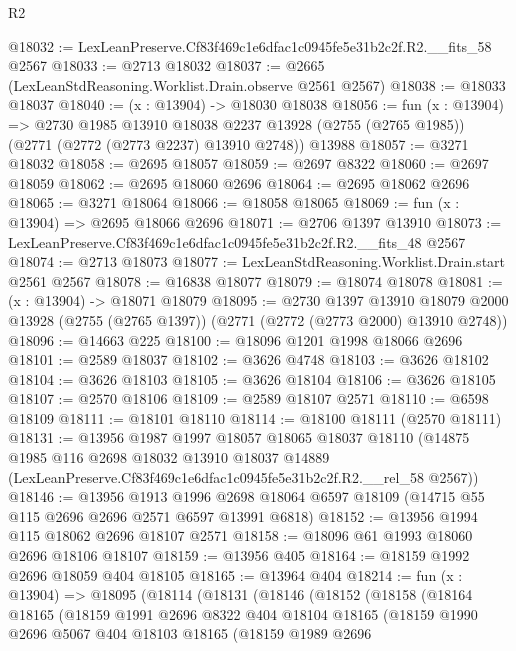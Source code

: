 \begin{lexlean}{R2}
\begin{coremodule}
@18032 := LexLeanPreserve.Cf83f469c1e6dfac1c0945fe5e31b2c2f.R2.__fits_58 @2567
@18033 := @2713 @18032
@18037 := @2665 (LexLeanStdReasoning.Worklist.Drain.observe @2561 @2567)
@18038 := @18033 @18037
@18040 := (x : @13904) -> @18030 @18038
@18056 := fun (x : @13904) =>
  @2730
    @1985
    @13910
    @18038
    @2237
    @13928
    (@2755 (@2765 @1985))
    (@2771 (@2772 (@2773 @2237) @13910 @2748))
    @13988
@18057 := @3271 @18032
@18058 := @2695 @18057
@18059 := @2697 @8322
@18060 := @2697 @18059
@18062 := @2695 @18060 @2696
@18064 := @2695 @18062 @2696
@18065 := @3271 @18064
@18066 := @18058 @18065
@18069 := fun (x : @13904) => @2695 @18066 @2696
@18071 := @2706 @1397 @13910
@18073 := LexLeanPreserve.Cf83f469c1e6dfac1c0945fe5e31b2c2f.R2.__fits_48 @2567
@18074 := @2713 @18073
@18077 := LexLeanStdReasoning.Worklist.Drain.start @2561 @2567
@18078 := @16838 @18077
@18079 := @18074 @18078
@18081 := (x : @13904) -> @18071 @18079
@18095 := @2730
    @1397
    @13910
    @18079
    @2000
    @13928
    (@2755 (@2765 @1397))
    (@2771 (@2772 (@2773 @2000) @13910 @2748))
@18096 := @14663 @225
@18100 := @18096 @1201 @1998 @18066 @2696
@18101 := @2589 @18037
@18102 := @3626 @4748
@18103 := @3626 @18102
@18104 := @3626 @18103
@18105 := @3626 @18104
@18106 := @3626 @18105
@18107 := @2570 @18106
@18109 := @2589 @18107 @2571
@18110 := @6598 @18109
@18111 := @18101 @18110
@18114 := @18100 @18111 (@2570 @18111)
@18131 := @13956
    @1987
    @1997
    @18057
    @18065
    @18037
    @18110
    (@14875
      @1985
      @116
      @2698
      @18032
      @13910
      @18037
      @14889
      (LexLeanPreserve.Cf83f469c1e6dfac1c0945fe5e31b2c2f.R2.__rel_58 @2567))
@18146 := @13956
    @1913
    @1996
    @2698
    @18064
    @6597
    @18109
    (@14715 @55 @115 @2696 @2696 @2571 @6597 @13991 @6818)
@18152 := @13956 @1994 @115 @18062 @2696 @18107 @2571
@18158 := @18096 @61 @1993 @18060 @2696 @18106 @18107
@18159 := @13956 @405
@18164 := @18159 @1992 @2696 @18059 @404 @18105
@18165 := @13964 @404
@18214 := fun (x : @13904) =>
  @18095
    (@18114
      (@18131
        (@18146
          (@18152
            (@18158
              (@18164
                @18165
                (@18159
                  @1991
                  @2696
                  @8322
                  @404
                  @18104
                  @18165
                  (@18159
                    @1990
                    @2696
                    @5067
                    @404
                    @18103
                    @18165
                    (@18159
                      @1989
                      @2696

\end{coremodule}
\end{lexlean}
